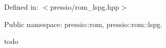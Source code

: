 Defined in\+: {\ttfamily $<$pressio/rom\+\_\+lspg.\+hpp$>$}

Public namespace\+: {\ttfamily pressio\+::rom}, {\ttfamily pressio\+::rom\+::lspg}.

todo 